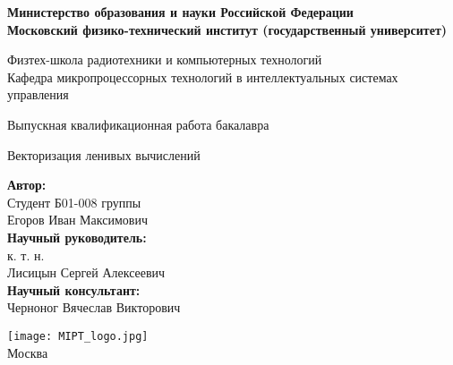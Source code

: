 \begin{center}
    \large\textbf{Министерство образования и науки Российской Федерации \\
    Московский физико-технический институт (государственный
    университет)} \\
    \vspace{1cm}

    Физтех-школа радиотехники и компьютерных технологий \\

    Кафедра микропроцессорных технологий в интеллектуальных системах управления \\

    \vspace{3em}

    Выпускная квалификационная работа бакалавра
\end{center}

\begin{center}
    \vspace{\fill}
    \LARGE{Векторизация ленивых вычислений}

    \vspace{\fill}
\end{center}


\begin{flushright}
    \textbf{Автор:} \\
    Студент Б01-008 группы \\
    Егоров Иван Максимович \\
    \vspace{2em}
    \textbf{Научный руководитель:} \\
    к. т. н. \\
    Лисицын Сергей Алексеевич \\
    \vspace{2em}
    \textbf{Научный консультант:} \\
    Черноног Вячеслав Викторович \\
\end{flushright}

\vspace{7em}

\begin{center}
    \texttt{[image: MIPT\_logo.jpg]}\\
    Москва \the\year{}
\end{center}

\thispagestyle{empty}

\newpage
\setcounter{page}{2}
\fancyfoot[c]{\thepage}
\fancyhead[R]{}